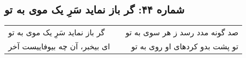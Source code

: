 \begin{center}
\section*{شماره ۴۴: گر باز نماید سَرِ یک موی به تو}
\label{sec:044}
\begin{longtable}{l p{0.5cm} r}
گر باز نماید سَرِ یک موی به تو
&&
صد گونه مدد رسد ز هر سوی به تو
\\
ای بیخبر، آن چه بیوفاییست آخر
&&
تو پشت بدو کردهای او روی به تو
\\
\end{longtable}
\end{center}
